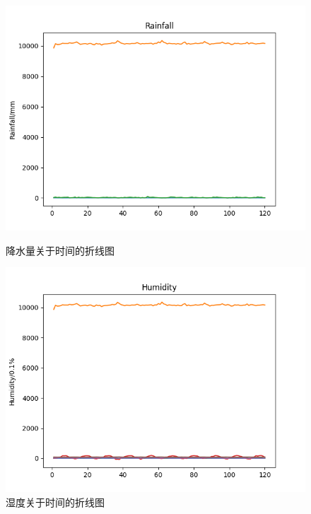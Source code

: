 \documentclass[UTF8, a4paper]{ctexart}
\begin{document}
\begin{figure}[h!]
	\centering
	\begin{minipage}[h!]{0.4\textwidth}
		\centering
		\includegraphics[scale=0.3]{../src/prepare_data/rr.png}
		\caption{降水量关于时间的折线图}
	\end{minipage}
	\begin{minipage}[h!]{0.4\textwidth}
		\centering
		\includegraphics[scale=0.3]{../src/prepare_data/hu.png}
		\caption{湿度关于时间的折线图}
	\end{minipage}
\end{figure}
\end{document}
